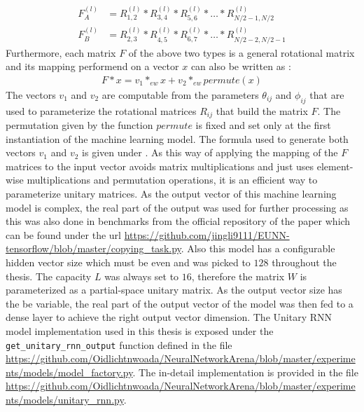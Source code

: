 \documentclass[draft,final]{vutinfth} %
\begin{document}
    \begin{align}
    F_A^{(l)} &= R_{1,2}^{(l)} * R_{3,4}^{(l)} * R_{5,6}^{(l)} * \ldots * R_{N/2-1,N/2}^{(l)} \\
    F_B^{(l)} &= R_{2,3}^{(l)} * R_{4,5}^{(l)} * R_{6,7}^{(l)} * \ldots * R_{N/2-2,N/2-1}^{(l)}
    \end{align}
    Furthermore, each matrix $F$ of the above two types is a general rotational matrix and its mapping performend on a vector $x$ can also be written as \cite[p. 4]{EfficientUnitaryRNNs}:
    \begin{align}
    F*x = v_1 *_{ew} x + v_2 *_{ew} permute(x)
    \end{align}
    The vectors $v_1$ and $v_2$ are computable from the parameters $\theta_{ij}$ and $\phi_{ij}$ that are used to parameterize the rotational matrices $R_{ij}$ that build the matrix $F$.
    The permutation given by the function $permute$ is fixed and set only at the first instantiation of the machine learning model. 
    The formula used to generate both vectors $v_1$ and $v_2$ is given under \cite[p. 4]{EfficientUnitaryRNNs}.
    As this way of applying the mapping of the $F$ matrices to the input vector avoids matrix multiplications and just uses element-wise multiplications and permutation operations, it is an efficient way to parameterize unitary matrices.
    As the output vector of this machine learning model is complex, the real part of the output was used for further processing as this was also done in benchmarks from the official repository of the paper \cite{EfficientUnitaryRNNs} which can be found under the url \url{https://github.com/jingli9111/EUNN-tensorflow/blob/master/copying_task.py}.
    Also this model has a configurable hidden vector size which must be even and was picked to $128$ throughout the thesis.
    The capacity $L$ was always set to $16$, therefore the matrix $W$ is parameterized as a partial-space unitary matrix.
    As the output vector size has the be variable, the real part of the output vector of the model was then fed to a dense layer to achieve the right output vector dimension.
    The Unitary RNN model implementation used in this thesis is exposed under the \texttt{get\_unitary\_rnn\_output} function defined in the file \url{https://github.com/Oidlichtnwoada/NeuralNetworkArena/blob/master/experiments/models/model_factory.py}.
    The in-detail implementation is provided in the file \url{https://github.com/Oidlichtnwoada/NeuralNetworkArena/blob/master/experiments/models/unitary_rnn.py}.
    
\end{document}

